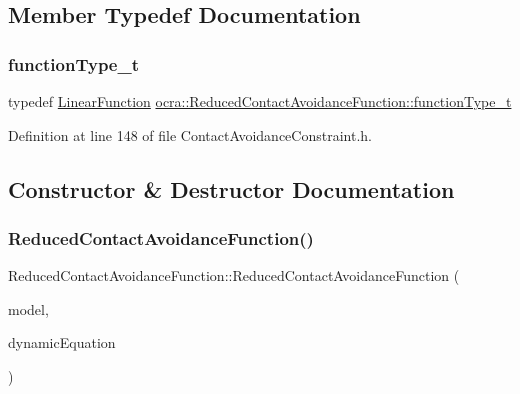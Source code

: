 \subsection{Member Typedef Documentation}
\hypertarget{classocra_1_1ReducedContactAvoidanceFunction_ae1d0c9b1c213515eabdb15cb7dc82869}{}\label{classocra_1_1ReducedContactAvoidanceFunction_ae1d0c9b1c213515eabdb15cb7dc82869} 
\subsubsection{\texorpdfstring{function\+Type\+\_\+t}{functionType\_t}}
{\footnotesize\ttfamily typedef \hyperlink{classocra_1_1LinearFunction}{Linear\+Function} \hyperlink{classocra_1_1ReducedContactAvoidanceFunction_ae1d0c9b1c213515eabdb15cb7dc82869}{ocra\+::\+Reduced\+Contact\+Avoidance\+Function\+::function\+Type\+\_\+t}}



Definition at line 148 of file Contact\+Avoidance\+Constraint.\+h.



\subsection{Constructor \& Destructor Documentation}
\hypertarget{classocra_1_1ReducedContactAvoidanceFunction_ae2183d53a13985590ee4f5cf59083803}{}\label{classocra_1_1ReducedContactAvoidanceFunction_ae2183d53a13985590ee4f5cf59083803} 
\subsubsection{\texorpdfstring{Reduced\+Contact\+Avoidance\+Function()}{ReducedContactAvoidanceFunction()}}
{\footnotesize\ttfamily Reduced\+Contact\+Avoidance\+Function\+::\+Reduced\+Contact\+Avoidance\+Function (\begin{DoxyParamCaption}\item[{const Model \&}]{model,  }\item[{const \hyperlink{classocra_1_1FullDynamicEquationFunction}{Full\+Dynamic\+Equation\+Function} \&}]{dynamic\+Equation }\end{DoxyParamCaption})}

